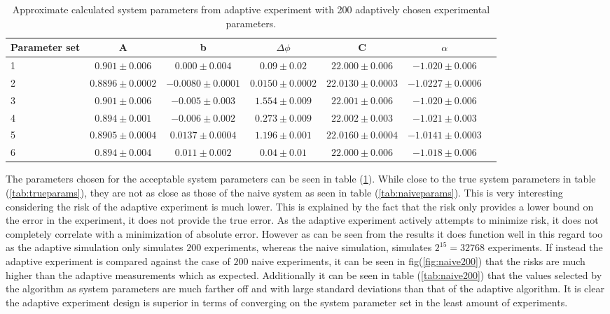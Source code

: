 \begin{table}[h]
\tiny
\begin{center}
\begin{tabular}{l*{5}{c}r}
Parameter set & A&b& $\Delta\phi$ & C & $\alpha$ \\
\hline
1&$0.901\pm 0.006	$& $0.000 \pm 0.004$&$	 0.09 \pm 0.02	$&$ 22.000 \pm 0.006$&$	 -1.020 \pm 0.006$\\	

2&$0.8896 \pm 0.0002	$&$ -0.0080 \pm 0.0001	$&$ 0.0150 \pm 0.0002	$&$ 22.0130 \pm 0.0003$&$ -1.0227 \pm 0.0006$\\

3&$0.901 \pm 0.006	$&$ -0.005 \pm 0.003	$&$ 1.554 \pm 0.009	$&$ 22.001 \pm 0.006	$&$ -1.020 \pm 0.006	$\\

4&$0.894 \pm 0.001$&$	 -0.006 \pm 0.002	$&$ 0.273 \pm 0.009$&$	 22.002 \pm 0.003	$&$ -1.021 \pm 0.003$	\\

5&$0.8905 \pm 0.0004 $&$0.0137 \pm 0.0004	$&$ 1.196 \pm 0.001$&$	 22.0160 \pm 0.0004	$&$ -1.0141 \pm 0.0003	$\\

6&$0.894 \pm 0.004	$&$ 0.011 \pm 0.002 $&$	 0.04 \pm 0.01 $&$22.000 \pm 0.006	$&$ -1.018 \pm 0.006$\\
\end{tabular}
\caption{Approximate calculated system parameters from adaptive experiment with 200 adaptively chosen experimental parameters.}
\label{tab:adaptivedparams}
\end{center}
\end{table}
The parameters chosen for the acceptable system parameters can be seen in table (\ref{tab:adaptivedparams}). While close to the true system parameters in table (\ref{tab:trueparams}), they are not as close as those of the naive system as seen in table (\ref{tab:naiveparams}). This is very interesting considering the risk of the adaptive experiment is much lower. This is explained by the fact that the risk only provides a lower bound on the error in the experiment, it does not provide the true error. As the adaptive experiment actively attempts to minimize risk, it does not completely correlate with a minimization of absolute error. However as can be seen from the results it does function well in this regard too as the adaptive simulation only simulates $200$ experiments, whereas the naive simulation, simulates $2^{15}=32768$ experiments. If instead the adaptive experiment is compared against the case of $200$ naive experiments, it can be seen in fig(\ref{fig:naive200}) that the risks are much higher than the adaptive measurements which as expected. Additionally it can be seen in table (\ref{tab:naive200}) that the values selected by the algorithm as system parameters are much farther off and with large standard deviations than that of the adaptive algorithm. It is clear the adaptive experiment design is superior in terms of converging on the system parameter set in the least amount of experiments. 

